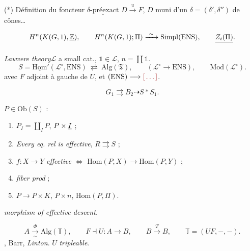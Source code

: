 \documentclass[11pt,a4paper]{article}
\begin{document}
(*) Définition du foncteur $\underline{\delta\text{-préexact}}$
$D \xrightarrow{\ u\ } F$, $D$ muni d'un $\delta = (\delta', \delta'')$ de
cônes…


\[
  H^{n}(K(G,1), \uncertain{\mathbb{Z}}), \qquad
  H^{n}(K(G,1); \Pi) \xrightarrow{\ \sim\ } \mathrm{Simpl}(\mathrm{ENS}),
  \qquad \struck{Z_{i}(\Pi)} .
\]

\emph{Lawvere theory}\quad $\mathcal{L}$ a small cat., $\mathbb{1} \in
\mathcal{L}$, $n = \coprod \mathbb{1}$.
\[
  S = \underline{\mathrm{Hom}}'(\mathcal{L}^{\circ}, \mathrm{ENS})
  \ \rightleftarrows\ \mathrm{Alg}(\mathfrak{T}),
  \qquad (\mathcal{L}^{\circ} \to \mathrm{ENS}), \qquad
  \mathrm{Mod}(\mathcal{L}^{\circ}) .
\]
avec $F$ adjoint à gauche de $U$, et $(\mathrm{ENS}) \longrightarrow \ill{}$.

\[
  G_{1} \rightrightarrows B_{2} \dashrightarrow S * S_{1} .
\]

$P \in \mathrm{Ob}(S)$ :

\begin{enumerate}
  \item[1\textsuperscript{o}] $P_{I} = \coprod_{I} P$, \quad $P \times \uncertain{I}$ ;
  \item[2\textsuperscript{o}] \emph{Every eq. rel is effective},
    $R \rightrightarrows S$ ;
  \item[3\textsuperscript{o}] $f : X \to Y$ \emph{effective}
     $\Longleftrightarrow$ $\mathrm{Hom}(P, X) \to \mathrm{Hom}(P, Y)$
     ;
  \item[4.] \emph{fiber prod} ;
  \item[5\textsuperscript{o}] $P \to P \times K$, $P \times n$,
    $\mathrm{Hom}(P, \Pi)$.
\end{enumerate}

\emph{morphism of  \emph{effective} descent.}

\[
  A \xrightarrow[\ \sim\ ]{\ \Phi\ } \mathrm{Alg}(\mathbb{T}),
  \qquad F \dashv U : A \to B, \qquad B \xrightarrow{\ T\ } B,
  \qquad \mathbb{T} = (UF, -, -) .
\]
, Barr, \emph{Linton}. \quad $U$
\emph{tripleable}.
\end{document}

